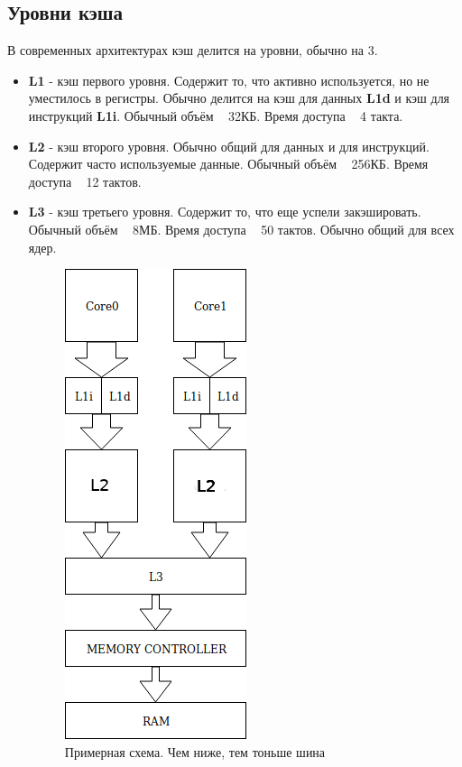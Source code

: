 \documentclass[12pt, a4paper]{article}
\begin{document}
\subsection{Уровни кэша}
В современных архитектурах кэш делится на уровни, обычно на 3.
\begin{itemize}
    \item \textbf{L1} - кэш первого уровня. Содержит то, что активно используется, но не уместилось в регистры. Обычно делится на кэш для данных \textbf{L1d} и кэш для инструкций \textbf{L1i}. Обычный объём ~ 32КБ. Время доступа ~ 4 такта.
    \item \textbf{L2} - кэш второго уровня. Обычно общий для данных и для инструкций. Содержит часто используемые данные. Обычный объём ~ 256КБ. Время доступа ~ 12 тактов.
    \item \textbf{L3} - кэш третьего уровня. Содержит то, что еще успели закэшировать. Обычный объём ~ 8МБ. Время доступа ~ 50 тактов. Обычно общий для всех ядер.
    \begin{figure}
        \centering
        \includegraphics[scale=0.4]{./images/CACHElevels}
        \caption{Примерная схема. Чем ниже, тем тоньше шина}
        \label{fig:CACHElevels}
    \end{figure}
\end{itemize}
\end{document}
